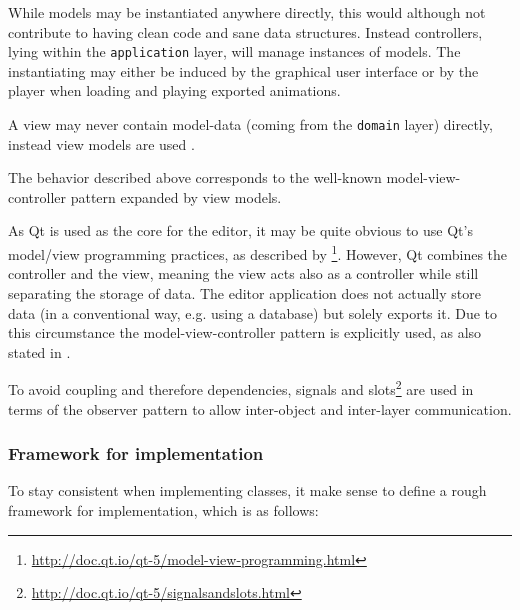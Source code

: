 \documentclass[10pt, openright, notitlepage]{scrreprt}
\begin{document}
While models may be instantiated anywhere directly, this would although not
contribute to having clean code and sane data structures. Instead controllers,
lying within the \texttt{application} layer, will manage instances of models.
The instantiating may either be induced by the graphical user interface
or by the player when loading and playing exported animations.

A view may never contain model-data (coming from the \texttt{domain} layer)
directly, instead view models are used \cite{martin_fowler_presentation_2004}.

The behavior described above corresponds to the well-known model-view-controller
pattern expanded by view models.

As Qt is used as the core for the editor, it may be quite obvious to use Qt's
model/view programming practices, as described by
\footnote{\url{http://doc.qt.io/qt-5/model-view-programming.html}}. However, Qt combines
the controller and the view, meaning the view acts also as a controller while
still separating the storage of data. The editor application does not actually
store data (in a conventional way, e.g. using a database) but solely exports it.
Due to this circumstance the model-view-controller pattern is explicitly used,
as also stated in \cite[p. 38]{osterwalder_qde_2016}.

\begin{center}
\end{center}
\begin{center}
\end{center}

To avoid coupling and therefore dependencies, signals and
slots\footnote{\url{http://doc.qt.io/qt-5/signalsandslots.html}} are used in terms of the
observer pattern to allow inter-object and inter-layer communication.

\subsubsection{Framework for implementation}
\label{sec:framework-for-implementation}
To stay consistent when implementing classes, it make sense to define a rough
framework for implementation, which is as follows:
\end{document}
